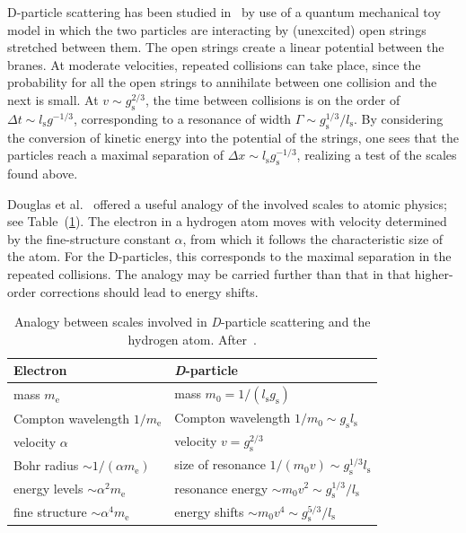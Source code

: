 \documentclass{article}
\begin{document}
D-particle scattering has been studied in~\cite{Douglas:1996yp} by use of a quantum mechanical 
toy model in which the two particles are interacting by (unexcited) open strings stretched between them. The open strings 
create a linear potential between the branes. At moderate velocities, repeated collisions can take place, since the 
probability for all the open strings to annihilate between one collision and the next is small. At $v \sim g_{\mathrm{s}}^{2/3}$, 
the time between
collisions is on the order of $\Delta t \sim l_{\mathrm{s}} g^{-1/3}$, corresponding to a resonance of width 
$\Gamma \sim g_{\mathrm{s}}^{1/3}/l_{\mathrm{s}}$. By considering the conversion of kinetic energy into the potential of the strings, one
sees that the particles reach a maximal separation of $\Delta x \sim l_{\mathrm{s}}g_{\mathrm{s}}^{-1/3}$, realizing a test of
the scales found above.

Douglas et al.~\cite{Douglas:1996yp} offered a useful analogy of the involved scales to atomic physics; 
see Table~(\ref{douglastable}). The electron in a hydrogen atom moves with velocity determined by the
fine-structure constant $\alpha$, from which it follows the characteristic size of the atom. For the
D-particles, this corresponds to the maximal separation in the repeated collisions. The analogy 
may be carried further than that in that higher-order corrections
should lead to energy shifts.

\begin{table}
  \caption[Analogy between scales involved in \textit{D}-particle scattering
    and the hydrogen atom.]{Analogy between scales involved in
    \textit{D}-particle scattering and the hydrogen
    atom. After~\cite{Douglas:1996yp}.}
  \label{douglastable}
\centering
\renewcommand{\arraystretch}{1.3}
\begin{tabular}{ l l }
  \toprule
  \textbf{Electron}  & \textbf{\textit{D}-particle} \\
  \midrule
  mass $m_{\mathrm{e}}$  & mass $m_0 = 1/(l_{\mathrm{s}} g_{\mathrm{s}})$  \\
  Compton wavelength $1/m_{\mathrm{e}}$ & Compton wavelength $1/m_0 \sim g_{\mathrm{s}} l_{\mathrm{s}}$ \\
  velocity $\alpha$ & velocity $v = g_{\mathrm{s}}^{2/3}$ \\
  Bohr radius $\sim 1/(\alpha m_{\mathrm{e}})$ & size of resonance $1/(m_0 v) \sim g_{\mathrm{s}}^{1/3} l_{\mathrm{s}}$ \\
  energy levels $\sim \alpha^2 m_{\mathrm{e}}$ & resonance energy $\sim m_0 v^2 \sim g_{\mathrm{s}}^{1/3}/l_{\mathrm{s}}$ \\
  fine structure $\sim \alpha^4 m_{\mathrm{e}}$ & energy shifts $\sim m_0 v^4 \sim g_{\mathrm{s}}^{5/3}/l_{\mathrm{s}}$ \\
  \bottomrule
\end{tabular}
\end{table}
\end{document}

